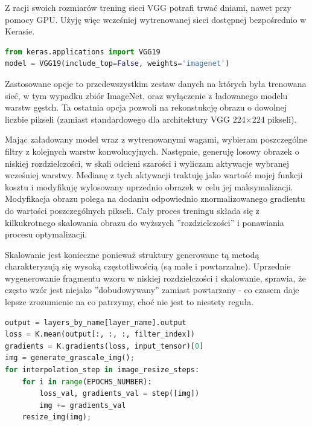 Z racji swoich rozmiarów trening sieci VGG potrafi trwać dniami, nawet przy pomocy GPU. Użyję więc wcześniej wytrenowanej sieci dostępnej bezpośrednio w Kerasie.

\label{lst:vggkeras}
\begin{lstlisting}[language=Python, caption={Wczytywanie wag VGG-19 w Keras.}, captionpos=b]
from keras.applications import VGG19
model = VGG19(include_top=False, weights='imagenet')
\end{lstlisting}

Zastosowane opcje to przedewszystkim zestaw danych na których była trenowana sieć, w tym wypadku zbiór ImageNet\cite{imagenet}, oraz wyłączenie z ładowanego modelu warstw gęstch. Ta ostatnia opcja pozwoli na rekonstukcję obrazu o dowolnej liczbie pikseli (zamiast standardowego dla architektury VGG 224\(\times\)224 pikseli).

Mając załadowany model wraz z wytrenowanymi wagami, wybieram poszczególne filtry z kolejnych warstw konwolucyjnych. Następnie, generuję losowy obrazek o niskiej rozdzielczości, w skali odcieni szarości i wyliczam aktywacje wybranej wcześniej warstwy. Medianę z tych aktywacji traktuję jako wartość mojej funkcji kosztu i modyfikuję wylosowany uprzednio obrazek w celu jej maksymalizacji.
Modyfikacja obrazu polega na dodaniu odpowiednio znormalizowanego gradientu do wartości poszczególnych pikseli. Cały proces treningu składa się z kilkukrotnego skalowania obrazu do wyższych ''rozdzielczości'' i ponawiania procesu optymalizacji. 

Skalowanie jest konieczne ponieważ struktury generowane tą metodą charakteryzują się wysoką częstotliwością (są małe i powtarzalne). Uprzednie wygenerowanie fragmentu wzoru w niskiej rozdzielczości i skalowanie, sprawia, że często wzór jest niejako ''dobudowywany'' zamiast powtarzany - co czasem daje lepsze zrozumienie na co patrzymy, choć nie jest to niestety reguła.

\label{lst:vggmeantraining}
\begin{lstlisting}[language=Python, caption={Wizualizowanie poprzez maksymalizację mediany wybranej warstwy.}, captionpos=b]
output = layers_by_name[layer_name].output
loss = K.mean(output[:, :, :, filter_index])
gradients = K.gradients(loss, input_tensor)[0]
img = generate_grascale_img();
for interpolation_step in image_resize_steps:
    for i in range(EPOCHS_NUMBER):
        loss_val, gradients_val = step([img])
        img += gradients_val 
    resize_img(img);
\end{lstlisting}


